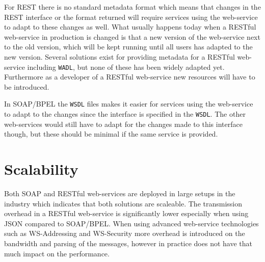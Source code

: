 For REST there is no standard metadata format which means that changes in the REST interface or the format returned will require services using the web-service to adapt to these changes as well. What usually happens today when a RESTful web-service in production is changed is that a new version of the web-service next to the old version, which will be kept running until all users has adapted to the new version. Several solutions exist for providing metadata for a RESTful web-service including \texttt{WADL}, but none of these has been widely adapted yet. Furthermore as a developer of a RESTful web-service new resources will have to be introduced.

In SOAP/BPEL the \texttt{WSDL} files makes it easier for services using the web-service to adapt to the changes since the interface is specified in the \texttt{WSDL}. The other web-services would still have to adapt for the changes made to this interface though, but these should be minimal if the same service is provided.

\section{Scalability}
Both SOAP and RESTful web-services are deployed in large setups in the industry which indicates that both solutions are scaleable. The transmission overhead in a RESTful web-service is significantly lower especially when using JSON compared to SOAP/BPEL. When using advanced web-service technologies such as WS-Addressing and WS-Security more overhead is introduced on the bandwidth and parsing of the messages, however in practice does not have that much impact on the performance.

